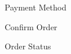 \documentclass[11pt]{report}
\begin{document}
\begin{figure}[H]
	\caption{Payment Method}
	\label{fig:s7}
\end{figure}
\begin{figure}[H]
	\caption{Confirm Order}
	\label{fig:s8}
\end{figure}
\begin{figure}[H]
	\caption{Order Status}
	\label{fig:s9}
\end{figure}
\end{document}
